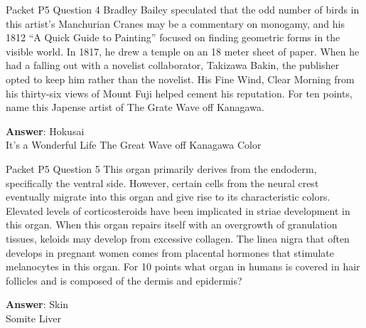 \begin{frame}{Packet P5 Question 4}
Bradley Bailey speculated   that the odd number of birds in this artist's Manchurian Cranes may be a commentary on monogamy, and his 1812 ``A Quick Guide to Painting'' focused on finding geometric forms in the visible world.   In 1817, he drew a temple on an 18 meter sheet of paper.  When he had a falling out with a novelist collaborator, Takizawa Bakin, the publisher opted to keep him rather than the novelist.  His Fine Wind, Clear Morning from   his thirty-six views of Mount Fuji helped     cement his reputation.  For ten points, name this Japense artist of The Grate Wave off Kanagawa.    

\textbf{Answer}: Hokusai\\
 It's a Wonderful Life
 The Great Wave off Kanagawa
 Color
\end{frame}

\begin{frame}{Packet P5 Question 5}
This organ primarily derives   from the endoderm, specifically the ventral side. However, certain cells from the neural crest eventually migrate into this organ and give rise to its characteristic colors. Elevated levels of corticosteroids have been implicated in striae development in this organ. When this   organ repairs itself with an overgrowth of granulation tissues, keloids may develop from excessive collagen. The linea nigra that often develops in pregnant women comes from placental hormones that stimulate melanocytes in this organ. For 10 points what organ in humans is covered in hair follicles and is composed of   the dermis and epidermis?    

\textbf{Answer}: Skin\\
 Somite
 Liver
\end{frame}


